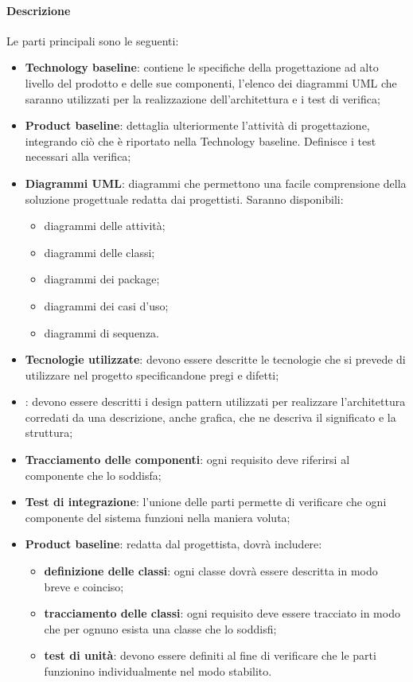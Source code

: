 \paragraph{Descrizione}
Le parti principali sono le seguenti:
\begin{itemize}
  \item \textbf{Technology baseline}: contiene le specifiche della progettazione ad alto livello del prodotto e delle sue componenti, l'elenco dei diagrammi UML che saranno utilizzati per la realizzazione dell'architettura e i test di verifica;

  \item \textbf{Product baseline}: dettaglia ulteriormente l'attività di progettazione, integrando ciò che è riportato nella Technology baseline. Definisce i test necessari alla verifica;

  \item \textbf{Diagrammi UML}: diagrammi che permettono una facile comprensione della soluzione progettuale redatta dai progettisti. Saranno disponibili:
        \begin{itemize}
          \item diagrammi delle attività;
          \item diagrammi delle classi;
          \item diagrammi dei package;
          \item diagrammi dei casi d'uso;
          \item diagrammi di sequenza.
        \end{itemize}
  \item \textbf{Tecnologie utilizzate}: devono essere descritte le tecnologie che si prevede di utilizzare nel progetto specificandone pregi e difetti;
  \item \textbf{}: devono essere descritti i design pattern utilizzati per realizzare l'architettura corredati da una descrizione, anche grafica, che ne descriva il significato e la struttura;
  \item \textbf{Tracciamento delle componenti}: ogni requisito deve riferirsi al componente che lo soddisfa;
  \item \textbf{Test di integrazione}: l'unione delle parti permette di verificare che ogni componente del sistema funzioni nella maniera voluta;
  \item \textbf{Product baseline}: redatta dal progettista, dovrà includere:
        \begin{itemize}
          \item \textbf{definizione delle classi}: ogni classe dovrà essere descritta in modo breve e coinciso;
          \item \textbf{tracciamento delle classi}: ogni requisito deve essere tracciato in modo che per ognuno esista una classe che lo soddisfi;
          \item \textbf{test di unità}: devono essere definiti al fine di verificare che le parti funzionino individualmente nel modo stabilito.
        \end{itemize}
\end{itemize}

